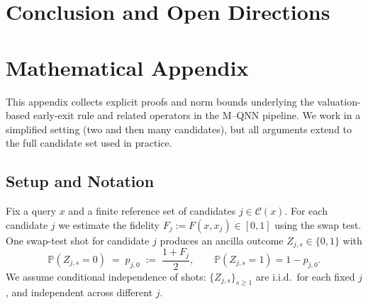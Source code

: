 \documentclass[11pt]{article}
\begin{document}

\section{Conclusion and Open Directions}



\appendix
\section{Mathematical Appendix}
\label{app:math}

This appendix collects explicit proofs and norm bounds underlying the
valuation-based early-exit rule and related operators in the M--QNN
pipeline.  We work in a simplified setting (two and then many
candidates), but all arguments extend to the full candidate set used in
practice.

\subsection{Setup and Notation}

Fix a query \(x\) and a finite reference set of candidates
\(j \in \mathcal{C}(x)\).
For each candidate \(j\) we estimate the fidelity
\(F_j := F(x,x_j)\in[0,1]\) using the swap test.
One swap-test shot for candidate \(j\) produces an ancilla outcome
\(Z_{j,s}\in\{0,1\}\) with
\begin{equation}
  \mathbb{P}(Z_{j,s}=0)
  \;=\;
  p_{j,0}
  \;:=\;
  \frac{1+F_j}{2},
  \qquad
  \mathbb{P}(Z_{j,s}=1) = 1-p_{j,0}.
\end{equation}
We assume conditional independence of shots:
\(\{Z_{j,s}\}_{s\ge 1}\) are i.i.d.\ for each fixed \(j\),
and independent across different \(j\).
\end{document}

